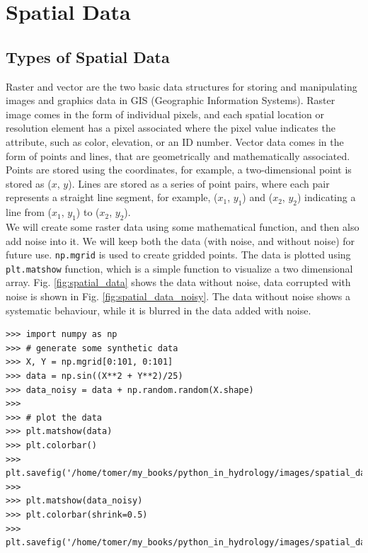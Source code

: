 \documentclass[10pt]{book}
\begin{document}
{\chapter{Spatial Data}
\section{Types of Spatial Data}
Raster and vector are the two basic data structures for storing and manipulating images and graphics data in GIS (Geographic Information Systems). Raster image comes in the form of individual pixels, and each spatial location or resolution element has a pixel associated where the pixel value indicates the attribute, such as color, elevation, or an ID number. Vector data comes in the form of points and lines, that are geometrically and mathematically associated. Points are stored using the coordinates, for example, a two-dimensional point is stored as ($x$, $y$). Lines are stored as a series of point pairs, where each pair represents a straight line segment, for example, ($x_1$, $y_1$) and ($x_2$, $y_2$) indicating a line from ($x_1$, $y_1$) to ($x_2$, $y_2$).\\

We will create some raster data using some mathematical function, and then also add noise into it. We will keep both the data (with noise, and without noise) for future use. \verb"np.mgrid" is used to create gridded points. The data is plotted using \verb"plt.matshow" function, which is a simple function to visualize a two dimensional array. Fig. \ref{fig:spatial_data} shows the data without noise, data corrupted with noise is shown in Fig. \ref{fig:spatial_data_noisy}. The data without noise shows a systematic behaviour, while it is blurred in the data added with noise.

\beforeverb \begin{verbatim}
>>> import numpy as np
>>> # generate some synthetic data
>>> X, Y = np.mgrid[0:101, 0:101]
>>> data = np.sin((X**2 + Y**2)/25) 
>>> data_noisy = data + np.random.random(X.shape)
>>>    
>>> # plot the data
>>> plt.matshow(data)
>>> plt.colorbar()
>>> plt.savefig('/home/tomer/my_books/python_in_hydrology/images/spatial_data.png')
>>> 
>>> plt.matshow(data_noisy)
>>> plt.colorbar(shrink=0.5)
>>> plt.savefig('/home/tomer/my_books/python_in_hydrology/images/spatial_data_noisy.png')
\end{verbatim} \afterverb

}
\end{document}
